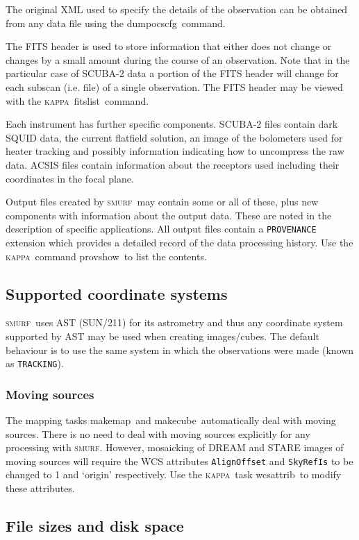 \documentclass[twoside,11pt]{article}
\newcommand{\xref}[3]{#1}
\renewcommand{\_}{\texttt{\symbol{95}}}
\newcommand{\KAPPA}{\textsc{kappa}}
\newcommand{\SMURF}{\textsc{smurf}}
\newcommand{\astref}{\xref{SUN/211}{sun211}{}}
\newcommand{\task}[1]{\textsf{#1}}
\newcommand{\makecube}{\xref{\task{makecube}}{sun258}{MAKECUBE}}
\newcommand{\dumpocscfg}{\xref{\task{dumpocscfg}}{sun258}{DUMPOCSCFG}}
\newcommand{\makemap}{\xref{\task{makemap}}{sun258}{MAKEMAP}}
\newcommand{\provshow}{\xref{\task{provshow}}{sun95}{PROVSHOW}}
\newcommand{\wcsattrib}{\xref{\task{wcsattrib}}{sun95}{WCSATTRIB}}
\newcommand{\fitslist}{\xref{\task{fitslist}}{sun95}{FITSLIST}}
\newcommand{\aparam}[1]{\texttt{#1}}     %
\newcommand{\ndfcomp}[1]{\texttt{#1}}    %
\begin{document}
The original XML used to specify the details of the observation can be
obtained from any data file using the \dumpocscfg\ command.

The FITS header is used to store information that either does not
change or changes by a small amount during the course of an
observation. Note that in the particular case of SCUBA-2 data a
portion of the FITS header will change for each subscan (i.e. file) of
a single observation. The FITS header may be viewed with the \KAPPA\
\fitslist\ command.

Each instrument has further specific components. SCUBA-2 files contain
dark SQUID data, the current flatfield solution, an image of the
bolometers used for heater tracking and possibly information
indicating how to uncompress the raw data. ACSIS files contain
information about the receptors used including their coordinates in
the focal plane.

Output files created by \SMURF\ may contain some or all of these, plus
new components with information about the output data. These are noted
in the description of specific applications. All output files contain
a \ndfcomp{PROVENANCE} extension which provides a detailed record of
the data processing history. Use the \KAPPA\ command \provshow\ to list
the contents.

\subsection{Supported coordinate systems}

\SMURF\ uses AST (\astref) for its astrometry and thus any coordinate
system supported by AST may be used when creating images/cubes. The
default behaviour is to use the same system in which the observations
were made (known as \aparam{TRACKING}).

\subsubsection{Moving sources}

The mapping tasks \makemap\ and \makecube\ automatically
deal with moving sources. There is no need to deal with moving sources
explicitly for any processing with \SMURF. However, mosaicking of
DREAM and STARE images of moving sources will require the WCS
attributes \verb+AlignOffset+ and \verb+SkyRefIs+ to be changed to 1
and `origin' respectively. Use the \KAPPA\ task \wcsattrib\ to
modify these attributes.

\subsection{File sizes and disk space}
\end{document}
